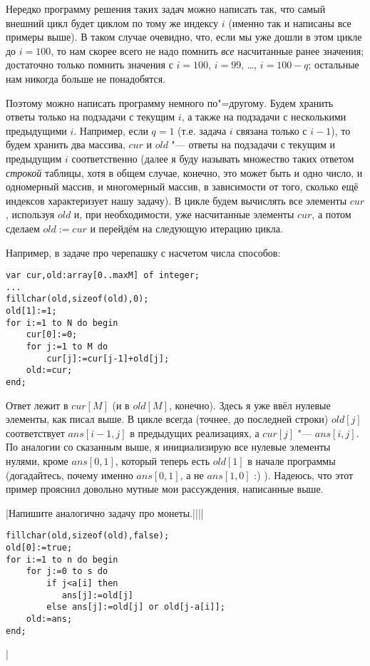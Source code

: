 Нередко программу решения таких задач можно написать так, что самый внешний цикл будет циклом по тому же индексу $i$ (именно так и 
написаны все примеры выше). В таком случае очевидно, что, если мы уже дошли в этом цикле до $i=100$, 
то нам скорее всего не надо помнить \textit{все} насчитанные ранее значения; достаточно только помнить значения с
$i=100$, $i=99$, \dots, $i=100-q$; остальные нам никогда больше не понадобятся.

Поэтому можно написать программу немного по"=другому. Будем хранить ответы только на подзадачи с текущим $i$, а также на подзадачи
с несколькими предыдущими $i$. Например, если $q=1$ (т.е. задача $i$ связана только с $i-1$), то будем хранить два массива,
$cur$ и $old$ "--- ответы на подзадачи с текущим и предыдущим $i$ соответственно (далее я буду называть множество таких ответом 
\textit{строкой} таблицы, хотя в общем случае, конечно, это может быть и одно число, и одномерный массив, и многомерный массив,
в зависимости от того, сколько ещё индексов характеризует нашу задачу). В цикле будем вычислять все элементы $cur$, используя
$old$ и, при необходимости, уже насчитанные элементы $cur$, а потом сделаем $old:=cur$ и перейдём на следующую итерацию цикла.

Например, в задаче про черепашку с насчетом числа способов:
\begin{codesampleo}\begin{verbatim}
var cur,old:array[0..maxM] of integer;
...
fillchar(old,sizeof(old),0);
old[1]:=1;
for i:=1 to N do begin
    cur[0]:=0;
    for j:=1 to M do
        cur[j]:=cur[j-1]+old[j];
    old:=cur;
end;
\end{verbatim}
\end{codesampleo}
Ответ лежит в $cur[M]$ (и в $old[M]$, конечно). Здесь я уже ввёл нулевые элементы, как писал выше. В цикле всегда
(точнее, до последней строки) $old[j]$ соответствует $ans[i-1,j]$ в предыдущих реализациях, а $cur[j]$ "--- $ans[i,j]$.
По аналогии со сказанным выше, я инициализирую все нулевые элементы нулями, кроме $ans[0,1]$, который теперь есть
$old[1]$ в начале программы (догадайтесь, почему именно $ans[0,1]$, а не $ans[1,0]$ :) ). Надеюсь, что этот пример прояснил
довольно мутные мои рассуждения, написанные выше.

\task|Напишите аналогично задачу про монеты.||||
\begin{codesampleo}\begin{verbatim}
fillchar(old,sizeof(old),false);
old[0]:=true;
for i:=1 to n do begin
    for j:=0 to s do
        if j<a[i] then
           ans[j]:=old[j]
        else ans[j]:=old[j] or old[j-a[i]];
    old:=ans;
end;
\end{verbatim}
\end{codesampleo}
|


